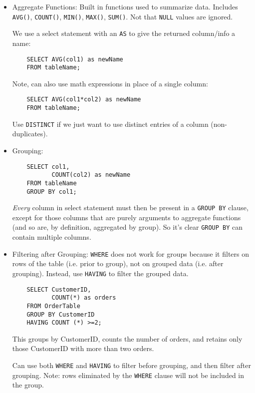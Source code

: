 \documentclass[12pt]{article}
\theoremstyle{plain}
\theoremstyle{definition}
\theoremstyle{remark}
\begin{document}
\begin{itemize}
  \item Aggregate Functions:
    Built in functions used to summarize data.
    Includes
    \texttt{AVG()},
    \texttt{COUNT()},
    \texttt{MIN()},
    \texttt{MAX()},
    \texttt{SUM()}.
    Not that \texttt{NULL} values are ignored.

    We use a select statement with an \texttt{AS} to give the returned
    column/info a name:
    \begin{lstlisting}
    SELECT AVG(col1) as newName
    FROM tableName;
    \end{lstlisting}
    Note, can also use math expressions in place of a single column:
    \begin{lstlisting}
    SELECT AVG(col1*col2) as newName
    FROM tableName;
    \end{lstlisting}
    Use \texttt{DISTINCT} if we just want to use distinct entries of a
    column (non-duplicates).

  \item Grouping:
    \begin{lstlisting}
    SELECT col1,
           COUNT(col2) as newName
    FROM tableName
    GROUP BY col1;
    \end{lstlisting}
    \emph{Every} column in select statement must then be present in a
    \texttt{GROUP BY} clause, except for those columns that are purely
    arguments to aggregate functions (and so are, by definition,
    aggregated by group).
    So it's clear \texttt{GROUP BY} can contain multiple columns.

  \item
    Filtering after Grouping:
    \texttt{WHERE} does not work for groups because it filters on rows
    of the table (i.e. prior to group), not on grouped data (i.e. after
    grouping).  Instead, use \texttt{HAVING} to filter the grouped data.
    \begin{lstlisting}
    SELECT CustomerID,
           COUNT(*) as orders
    FROM OrderTable
    GROUP BY CustomerID
    HAVING COUNT (*) >=2;
    \end{lstlisting}
    This groups by CustomerID, counts the number of orders, and retains
    only those CustomerID with more than two orders.

    Can use both \texttt{WHERE} and \texttt{HAVING} to filter before
    grouping, and then filter after grouping.
    Note: rows eliminated by the \texttt{WHERE} clause will not be
    included in the group.

\end{itemize}
\end{document}
